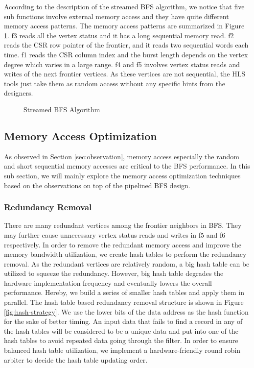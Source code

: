 According to the description of the streamed BFS algorithm, we notice that 
five sub functions involve external memory access and they have quite different 
memory access patterns. The memory access patterns are summarized in 
Figure \ref{fig:bfs-stream}. f3 reads all the vertex status and 
it has a long sequential memory read. f2 reads the CSR row pointer of the frontier, 
and it reads two sequential words each time. f1 reads the CSR column index and the 
burst length depends on the vertex degree which varies in a large range. 
f4 and f5 involves vertex status reads and writes of the next frontier vertices.
As these vertices are not sequential, the HLS tools just take them as random access 
without any specific hints from the designers. 

\begin{figure}
\caption{Streamed BFS Algorithm}
\label{fig:bfs-stream}
\end{figure}

\subsection{Memory Access Optimization}
As observed in Section \ref{sec:observation}, memory access especially the random and 
short sequential memory accesses are critical to the 
BFS performance. In this sub section, we will mainly explore the memory 
access optimization techniques based on the observations on top of 
the pipelined BFS design.

\subsubsection{Redundancy Removal}
There are many redundant vertices among the frontier neighbors in BFS. 
They may further cause unnecessary vertex status reads and writes in 
f5 and f6 respectively. In order to remove the redundant memory access 
and improve the memory bandwidth utilization, we create hash tables 
to perform the redundancy removal. As the redundant vertices are 
relatively random, a big hash table can be utilized to squeeze 
the redundancy. However, big hash table degrades the hardware implementation 
frequency and eventually lowers the overall performance. Hereby, we 
build a series of smaller hash tables and apply them in parallel. 
The hash table based redundancy removal structure is shown in Figure \ref{fig:hash-strategy}. 
We use the lower bits of the data address as the hash function 
for the sake of better timing. An input data that fails to find a 
record in any of the hash tables will be considered to be a unique 
data and put into one of the hash tables to avoid repeated data 
going through the filter. In order to ensure balanced hash 
table utilization, we implement a hardware-friendly round robin 
arbiter to decide the hash table updating order. 
  
